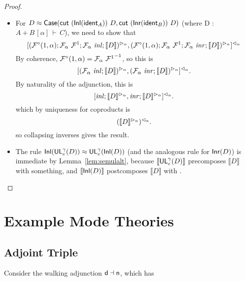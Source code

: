 \documentclass{drl-common/llncs}
\renewcommand{\sem}[1]{\ensuremath{ \llbracket #1 \rrbracket}}
\newcommand{\inv}[1]{\ensuremath{{#1}^{-1}}}
\newcommand{\la}{\ensuremath{\dashv}}
\newcommand\coprd[2]{\ensuremath{#1 + #2}}
\newcommand\seq[3]{\ensuremath{#1 \, [ #2 ] \, \vdash \, #3}}
\newcommand\ident[1]{\ensuremath{\dsd{ident}_{#1}}}
\newcommand\cutsym{\ensuremath{\dsd{cut}}}
\newcommand\cut[2]{\ensuremath{{\cutsym \,\, #1 \,\, #2}}}
\newcommand\Inl[1]{\ensuremath{\dsd{Inl}(#1)}}
\newcommand\Inr[1]{\ensuremath{\dsd{Inr}(#1)}}
\newcommand\Case[2]{\ensuremath{\dsd{Case}(#1,#2)}}
\newcommand\UL[3]{\ensuremath{\dsd{UL}^{#1}_{#2}(#3)}}
\newcommand\ap[2]{\ensuremath{#1 \approx #2}}
\begin{document}
\begin{proof}
\begin{itemize}
\item For 
{\ap D {\Case{\cut{(\Inl{\ident{A}})}{D}}{\cut{(\Inr{\ident{B}})}{D}}}}
(where {D : \seq{\coprd{A}{B}}{\alpha}{C}}),
we need to show that
\[
\semrtol{\semcase{\semltor{(\semFcomp(1,\alpha);\semF{\alpha}{\semFone};\semF{\alpha}{\seminl};\sem{D})}{\alpha}}{\semltor{(\semFcomp(1,\alpha);\semF{\alpha}{\semFone};\semF{\alpha}{\seminr};\sem{D})}{\alpha}}}{\alpha}
\]
By coherence, $\semFcomp(1,\alpha) = \inv{\semF{\alpha}{\semFone}}$, so
  this is
\[
\semrtol{\semcase{\semltor{(\semF{\alpha}{\seminl};\sem{D})}{\alpha}}{\semltor{(\semF{\alpha}{\seminr};\sem{D})}{\alpha}}}{\alpha}.
\]
By naturality of the adjunction, this is 
\[
\semrtol{\semcase{{\seminl};\semltor{\sem{D}}{\alpha}}{{\seminr};\semltor{\sem{D}}{\alpha}}}{\alpha}.
\]
which by uniqueness for coproducts is 
\[
\semrtol{(\semltor{\sem{D}}{\alpha})}{\alpha}.
\]
so collapsing inverses gives the result.  

\item The rule \ap{\Inl{\UL{\gamma}{e}{D}}}{\UL{\gamma}{e}{\Inl D}} (and
  the analogous rule for \Inr{D}) is immediate by
  Lemma~\ref{lem:semulalt}, because \sem{\UL{\gamma}{e}{D}} precomposes
  \sem{D} with something, and \sem{\Inl{D}} postcomposes \sem{D} with
  \seminl.

\end{itemize}
\end{proof}

\section{Example Mode Theories}
\label{sec:triple}

\subsection{Adjoint Triple}

Consider the walking adjunction $\dsd d \la \dsd n$, which has
\end{document}
